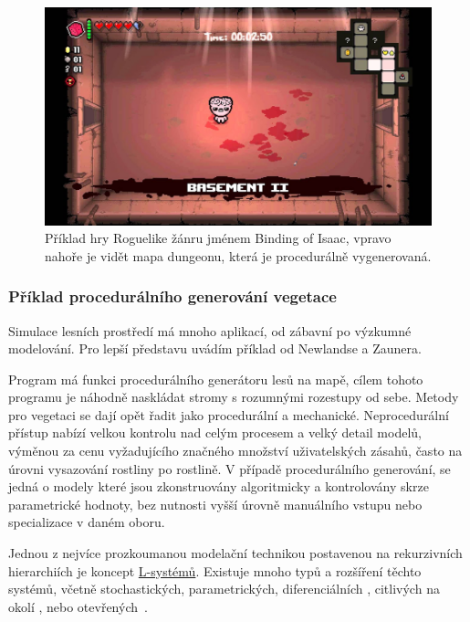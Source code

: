 \begin{figure}[H]
	\centering
	\includegraphics[scale=0.33]{obrazky-figures/BindingOfIsaac.jpg}
	\caption{Příklad hry Roguelike žánru jménem Binding of Isaac, vpravo nahoře je vidět mapa dungeonu, která je procedurálně vygenerovaná.}
\end{figure}

\subsubsection{Příklad procedurálního generování vegetace}
\label{proceduralExample}
Simulace lesních prostředí má mnoho aplikací, od zábavní po výzkumné modelování. Pro lepší představu uvádím příklad od Newlandse a Zaunera.~\cite{newlands2022procedural}

Program má funkci procedurálního generátoru lesů na mapě, cílem tohoto programu je náhodně naskládat stromy s rozumnými rozestupy od sebe. Metody pro vegetaci se dají opět řadit jako procedurální a mechanické. Neprocedurální přístup nabízí velkou kontrolu nad celým procesem a velký detail modelů, výměnou za cenu vyžadujícího značného množství uživatelských zásahů, často na úrovni vysazování rostliny po rostlině. V případě procedurálního generování, se jedná o modely které jsou zkonstruovány algoritmicky a kontrolovány skrze parametrické hodnoty, bez nutnosti vyšší úrovně manuálního vstupu nebo specializace v daném oboru.

Jednou z nejvíce prozkoumanou modelační technikou postavenou na rekurzivních hierarchiích je koncept \hyperref[lsystems]{L-systémů}. Existuje mnoho typů a rozšíření těchto systémů\cite{prusinkiewicz1986graphical}, včetně stochastických, parametrických, diferenciálních \cite{animationOfPlantDevelopment.}, citlivých na okolí \cite{syntheticTopiary}, nebo otevřených~\cite{PrusinkiewiczModelsOfPlants}.

